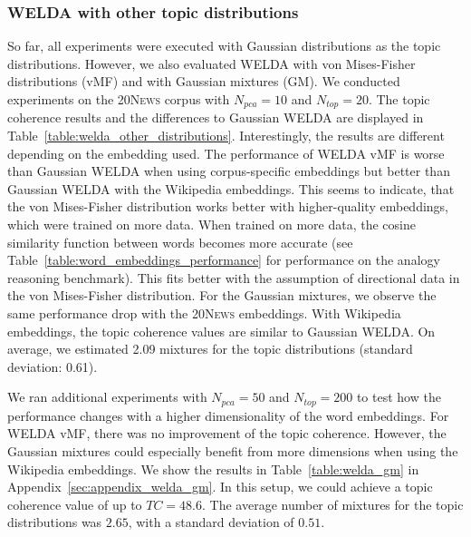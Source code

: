 \documentclass[
        a4paper,
        titlepage,
        twoside,
        parskip,
        numbers=noenddot
        ]{scrbook}
\theoremstyle{break}
\begin{document}
\subsubsection{WELDA with other topic distributions}

So far, all experiments were executed with Gaussian distributions as the topic distributions.
However, we also evaluated WELDA with von Mises-Fisher distributions (vMF) and with Gaussian mixtures (GM).
We conducted experiments on the \textsc{20News} corpus with $N_{pca} = 10$ and $N_{top} = 20$.
The topic coherence results and the differences to Gaussian WELDA are displayed in Table~\ref{table:welda_other_distributions}.
Interestingly, the results are different depending on the embedding used.
The performance of WELDA vMF is worse than Gaussian WELDA when using corpus-specific embeddings but better than Gaussian WELDA with the Wikipedia embeddings.
This seems to indicate, that the von Mises-Fisher distribution works better with higher-quality embeddings, which were trained on more data.
When trained on more data, the cosine similarity function between words becomes more accurate (see Table~\ref{table:word_embeddings_performance} for performance on the analogy reasoning benchmark).
This fits better with the assumption of directional data in the von Mises-Fisher distribution.
For the Gaussian mixtures, we observe the same performance drop with the \textsc{20News} embeddings.
With Wikipedia embeddings, the topic coherence values are similar to Gaussian WELDA.
On average, we estimated 2.09 mixtures for the topic distributions (standard deviation: 0.61).

We ran additional experiments with $N_{pca} = 50$ and $N_{top} = 200$ to test how the performance changes with a higher dimensionality of the word embeddings.
For WELDA vMF, there was no improvement of the topic coherence.
However, the Gaussian mixtures could especially benefit from more dimensions when using the Wikipedia embeddings.
We show the results in Table~\ref{table:welda_gm} in Appendix~\ref{sec:appendix_welda_gm}.
In this setup, we could achieve a topic coherence value of up to $TC = 48.6$.
The average number of mixtures for the topic distributions was $2.65$, with a standard deviation of $0.51$.
\end{document}

